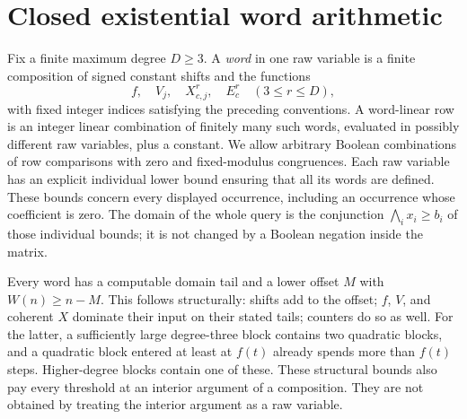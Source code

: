 \section{Closed existential word arithmetic}
\label{m:sec:word-arithmetic}
Fix a finite maximum degree $D\ge3$. A \emph{word} in one raw variable
is a finite composition of signed constant shifts and the functions
\[
 f,\quad V_j,\quad X^r_{c,j},\quad E^r_c\quad(3\le r\le D),
\]
with fixed integer indices satisfying the preceding conventions. A
word-linear row is an integer linear combination of finitely many such
words, evaluated in possibly different raw variables, plus a constant.
We allow arbitrary Boolean combinations of row comparisons with zero and
fixed-modulus congruences. Each raw variable has an explicit individual
lower bound ensuring that all its words are defined.
These bounds concern every displayed occurrence, including an occurrence
whose coefficient is zero.  The domain of the whole query is the
conjunction $\bigwedge_i x_i\ge b_i$ of those individual bounds;
it is not changed by a Boolean negation inside the matrix.

Every word has a computable domain tail and a lower offset $M$ with
$W(n)\ge n-M$. This follows structurally: shifts add to the offset;
$f$, $V$, and coherent $X$ dominate their input on their stated tails;
counters do so as well. For the latter, a sufficiently large degree-three
block contains two quadratic blocks, and a quadratic block entered at
least at $f(t)$ already spends more than $f(t)$ steps. Higher-degree blocks
contain one of these. These structural bounds also pay every threshold at
an interior argument of a composition. They are not obtained by treating
the interior argument as a raw variable.

